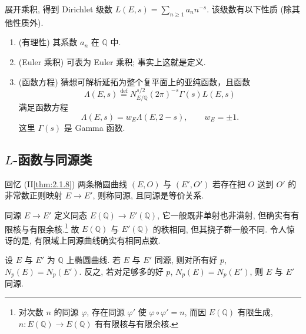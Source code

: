 展开乘积, 得到 Dirichlet 级数 $L(E, s) = \sum_{n\ge 1}a_nn^{-s}$. 该级数有以下性质 (除其他性质外).
\begin{enumerate}[label=\textup{(\alph*)}]
\item (有理性) 其系数 $a_n$ 在 $\mathbb{Q}$ 中.
\item (Euler 乘积) 可表为 Euler 乘积; 事实上这就是定义.
\item (函数方程) 猜想可解析延拓为整个复平面上的亚纯函数，且函数
\[
\Lambda(E, s) \overset{\text{def}}{=} N_{E/\mathbb{Q}}^{s/2}(2\pi)^{-s}\Gamma(s)L(E, s)
\]
满足函数方程
\[
\Lambda(E, s) = w_E\Lambda(E, 2-s), \qquad w_E = \pm 1.
\]
这里 $\Gamma(s)$ 是 Gamma 函数.
\end{enumerate}

\subsection*{$L$-函数与同源类}

回忆 (II\ref{thm:2.1.8}) 两条椭圆曲线 $(E, O)$ 与 $(E', O')$ 若存在把 $O$ 送到 $O'$ 的非常数正则映射 $E\to E'$, 则称同源, 且同源是等价关系.

同源 $E\to E'$ 定义同态 $E(\mathbb{Q})\to E'(\mathbb{Q})$, 它一般既非单射也非满射, 但确实有有限核与有限余核.\footnote{对次数 $n$ 的同源 $\varphi$, 存在同源 $\varphi'$ 使 $\varphi\circ\varphi' = n$, 而因 $E(\mathbb{Q})$ 有限生成, $n\colon E(\mathbb{Q})\to E(\mathbb{Q})$ 有有限核与有限余核.} 故 $E(\mathbb{Q})$ 与 $E'(\mathbb{Q})$ 的秩相同, 但其挠子群一般不同. 令人惊讶的是, 有限域上同源曲线确实有相同点数.

\begin{theorem} \label{thm:5.4.1} 
设 $E$ 与 $E'$ 为 $\mathbb{Q}$ 上椭圆曲线. 若 $E$ 与 $E'$ 同源, 则对所有好 $p$, $N_p(E) = N_p(E')$. 反之, 若对足够多的好 $p$, $N_p(E) = N_p(E')$, 则 $E$ 与 $E'$ 同源.
\end{theorem}

